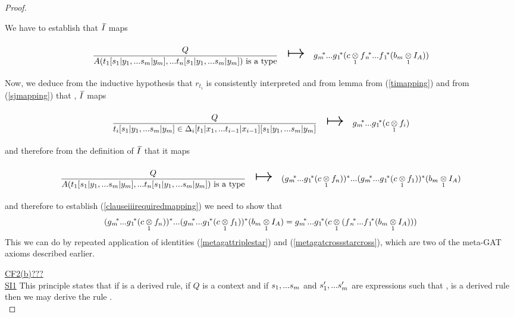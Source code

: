 \begin{proof}
\begin{newtt}
We have to establish that $\Ibar$ maps
\begin{equation}
\label{clauseiiirequiredmapping}
\begin{array}{c c c}
\forceSOURCEwidth & & \forceTARGETwidth \\ [-0.1cm]
\gatdisplayrule{Q}{\isT{A(t_1[\SUBsFORy{m}],...t_n[\SUBsFORy{m}])}}   & \Imapsto & \gmvectorstar (\crossx{c}{\fnvectorstar(\crossx{b_m}{I_A}{1})}{1}) \\ [0.4cm]
\end{array}
\end{equation}
Now, we deduce from  the inductive hypothesis that $r_{t_i}$ is consistently interpreted and 
from lemma  from (\ref{timapping}) and from (\ref{sjmapping}) that \foreachi, $\Ibar$ maps
\begin{equation}
\begin{array}{c c c}
\forceSOURCEwidth & & \forceTARGETwidth \\ [-0.1cm]
\gatdisplayrule{Q}{\ofT{t_i[\SUBsFORy{m}]}{\Delta_i[t_1 | x_1,...t_{i-1}|x_{i-1}][\SUBsFORy{m}]}}  & \Imapsto & \gmvectorstar (\crossx{c}{f_i}{1}) \\ [0.4cm]
\end{array}
\end{equation}
and therefore from the definition of $\Ibar$ that it maps
\begin{equation*}
\begin{array}{c c c}
\forceSOURCEwidth & & \forceTARGETwidth \\ [-0.1cm]
\gatdisplayrule{Q}{\isT{A(t_1[\SUBsFORy{m}],...t_n[\SUBsFORy{m}])}}  & \Imapsto & \clausethreelhs \\ [0.4cm]
\end{array}
\end{equation*}
and therefore to establish (\ref{clauseiiirequiredmapping}) we need to show that
\begin{equation*}
(g{_m}\kern-.25em^*...g{_1}\kern-.15em^* (c \underset{1}{\otimes} f_n))^* ... (g{_m}\kern-.25em^*...g{_1}\kern-.15em^* (c \underset{1}{\otimes} f_1)) ^* (b_m \underset{1}{\otimes} I_A) = g{_m}\kern-.25em^*...g{_1}\kern-.15em^* ( c \underset{1}{\otimes} (f{_n}\kern-.2em^*...f{_1}\kern-.15em^*(b_m \underset{1}{\otimes} I_A)) )										
\end{equation*}
This we can do by repeated application of identities (\ref{metagattriplestar})
and (\ref{metagatcrossstarcross}), which are two of the meta-GAT axioms described earlier.\\
\end{newtt}

\underline{CF2(b)???} \\

\underline{SI1} 
This principle states that if  is a derived rule, if $Q$ is a context and if  $s_1,...s_{m}$ and $s'_1,...s'_{m}$ are expressions such that
\foreachj,  is a derived rule then we may derive the rule
. \\


\end{proof}
